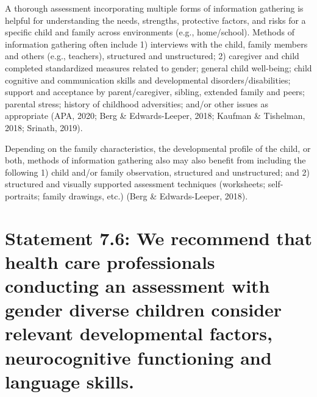 \documentclass[
]{book}
\begin{document}
A thorough assessment incorporating multiple
forms of information gathering is helpful for
understanding the needs, strengths, protective
factors, and risks for a specific child and family
across environments (e.g., home/school). Methods
of information gathering often include 1) interviews with the child, family members and others
(e.g., teachers), structured and unstructured; 2)
caregiver and child completed standardized measures related to gender; general child well-being;
child cognitive and communication skills and
developmental disorders/disabilities; support and
acceptance by parent/caregiver, sibling, extended
family and peers; parental stress; history of childhood adversities; and/or other issues as appropriate (APA, 2020; Berg \& Edwards-Leeper, 2018;
Kaufman \& Tishelman, 2018; Srinath, 2019).

Depending on the family characteristics, the
developmental profile of the child, or both, methods of information gathering also may also benefit
from including the following 1) child and/or family observation, structured and unstructured; and
2) structured and visually supported assessment
techniques (worksheets; self-portraits; family drawings, etc.) (Berg \& Edwards-Leeper, 2018).

\hypertarget{statement-7.6-we-recommend-that-health-care-professionals-conducting-an-assessment-with-gender-diverse-children-consider-relevant-developmental-factors-neurocognitive-functioning-and-language-skills.}{%
\section*{Statement 7.6: We recommend that health care professionals conducting an assessment with gender diverse children consider relevant developmental factors, neurocognitive functioning and language skills.}\label{statement-7.6-we-recommend-that-health-care-professionals-conducting-an-assessment-with-gender-diverse-children-consider-relevant-developmental-factors-neurocognitive-functioning-and-language-skills.}}
\end{document}
